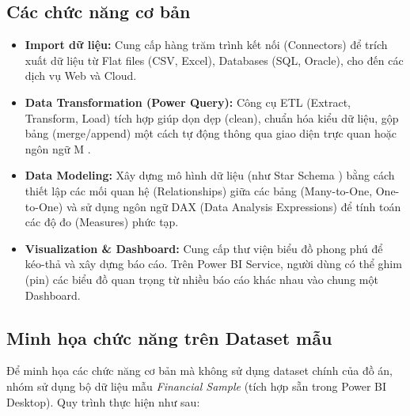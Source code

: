 \subsection{Các chức năng cơ bản}
\begin{itemize}
    \item \textbf{Import dữ liệu:} Cung cấp hàng trăm trình kết nối (Connectors) để trích xuất dữ liệu từ Flat files (CSV, Excel), Databases (SQL, Oracle), cho đến các dịch vụ Web và Cloud.
    \item \textbf{Data Transformation (Power Query):} Công cụ ETL (Extract, Transform, Load) tích hợp giúp dọn dẹp (clean), chuẩn hóa kiểu dữ liệu, gộp bảng (merge/append) một cách tự động thông qua giao diện trực quan hoặc ngôn ngữ M \cite{powerquery_docs}.
    \item \textbf{Data Modeling:} Xây dựng mô hình dữ liệu (như Star Schema \cite{kimball2013}) bằng cách thiết lập các mối quan hệ (Relationships) giữa các bảng (Many-to-One, One-to-One) và sử dụng ngôn ngữ DAX (Data Analysis Expressions) để tính toán các độ đo (Measures) phức tạp.
    \item \textbf{Visualization \& Dashboard:} Cung cấp thư viện biểu đồ phong phú để kéo-thả và xây dựng báo cáo. Trên Power BI Service, người dùng có thể ghim (pin) các biểu đồ quan trọng từ nhiều báo cáo khác nhau vào chung một Dashboard.
\end{itemize}

\subsection{Minh họa chức năng trên Dataset mẫu}
Để minh họa các chức năng cơ bản mà không sử dụng dataset chính của đồ án, nhóm sử dụng bộ dữ liệu mẫu \textit{Financial Sample} (tích hợp sẵn trong Power BI Desktop). Quy trình thực hiện như sau:

